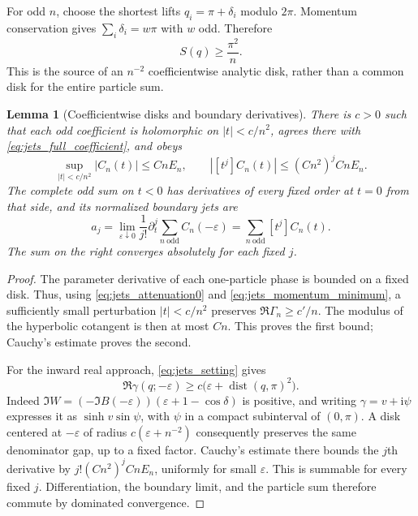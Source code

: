 \documentclass[11pt]{article}
\numberwithin{equation}{section}
\newtheorem{lemma}[theorem]{Lemma}
\theoremstyle{definition}
\newcommand{\ii}{\mathrm i}
\newcommand{\eps}{\varepsilon}
\newcommand{\dist}{\operatorname{dist}}
\begin{document}
For odd $n$, choose the shortest lifts $q_i=\pi+\delta_i$ modulo
$2\pi$. Momentum conservation gives
$\sum_i\delta_i=w\pi$ with $w$ odd. Therefore
\begin{equation}\label{eq:jets_momentum_minimum}
 S(q)\ge\frac{\pi^2}{n}.
\end{equation}
This is the source of an $n^{-2}$ coefficientwise analytic disk, rather
than a common disk for the entire particle sum.

\begin{lemma}[Coefficientwise disks and boundary derivatives]
\label{lem:jets_boundary_derivatives}
There is $c>0$ such that each odd coefficient is holomorphic on
$|t|<c/n^2$, agrees there with \eqref{eq:jets_full_coefficient}, and
obeys
\begin{equation}\label{eq:jets_small_disk}
 \sup_{|t|<c/n^2}|C_n(t)|\le CnE_n,
 \qquad |[t^j]C_n(t)|\le (Cn^2)^j CnE_n.
\end{equation}
The complete odd sum on $t<0$ has derivatives of every fixed order at
$t=0$ from that side, and its normalized boundary jets are
\begin{equation}\label{eq:jets_boundary_coefficients}
 a_j=\lim_{\eps\downarrow0}\frac1{j!}
       \partial_t^j\sum_{n\ \mathrm{odd}}C_n(-\eps)
     =\sum_{n\ \mathrm{odd}}[t^j]C_n(t).
\end{equation}
The sum on the right converges absolutely for each fixed $j$.
\end{lemma}

\begin{proof}
The parameter derivative of each one-particle phase is bounded on a
fixed disk. Thus, using \eqref{eq:jets_attenuation0} and
\eqref{eq:jets_momentum_minimum}, a sufficiently small perturbation
$|t|<c/n^2$ preserves $\Re\Gamma_n\ge c'/n$. The modulus of the
hyperbolic cotangent is then at most $Cn$. This proves the first bound;
Cauchy's estimate proves the second.

For the inward real approach, \eqref{eq:jets_setting} gives
\[
 \Re\gamma(q;-\eps)\ge
 c\bigl(\eps+\dist(q,\pi)^2\bigr).
\]
Indeed $\Im W=(-\Im B(-\eps))(\eps+1-\cos\delta)$ is positive,
and writing $\gamma=v+\ii\psi$ expresses it as
$\sinh v\sin\psi$, with $\psi$ in a compact subinterval of
$(0,\pi)$. A disk centered at $-\eps$ of radius
$c(\eps+n^{-2})$ consequently preserves the same denominator gap,
up to a fixed factor. Cauchy's estimate there bounds the $j$th
derivative by $j!(Cn^2)^j CnE_n$, uniformly for small $\eps$.
This is summable for every fixed $j$. Differentiation, the boundary
limit, and the particle sum therefore commute by dominated
convergence.
\end{proof}
\end{document}
